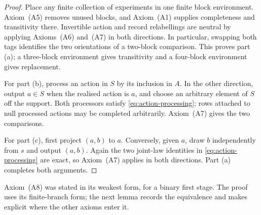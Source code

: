 \documentclass[11pt,a4paper]{article}
\theoremstyle{definition}
\newcommand{\1}{\mathbf 1}
\begin{document}
\begin{proof}
Place any finite collection of experiments in one finite block environment.
Axiom~\textup{(A5)} removes unused blocks, and Axiom~\textup{(A1)} supplies
completeness and transitivity there.  Invertible action and record relabellings
are neutral by applying Axioms~\textup{(A6)} and~\textup{(A7)} in both
directions.  In particular, swapping both tags identifies the two orientations
of a two-block comparison.  This proves part \textup{(a)}; a three-block
environment gives transitivity and a four-block environment gives replacement.

For part \textup{(b)}, process an action in $S$ by its inclusion in $A$.  In the
other direction, output $a\in S$ when the realised action is $a$, and choose an
arbitrary element of $S$ off the support.  Both processors satisfy
\eqref{eq:action-processing}; rows attached to null processed actions may be
completed arbitrarily.  Axiom~\textup{(A7)} gives the two comparisons.

For part \textup{(c)}, first project $(a,b)$ to $a$.  Conversely, given $a$,
draw $b$ independently from $s$ and output $(a,b)$.  Again the two joint-law
identities in \eqref{eq:action-processing} are exact, so Axiom~\textup{(A7)}
applies in both directions.  Part \textup{(a)} completes both arguments.
\end{proof}


Axiom~\textup{(A8)} was stated in its weakest form, for a binary first
stage.  The proof uses its finite-branch form; the next lemma records the
equivalence and makes explicit where the other axioms enter it.
\end{document}
